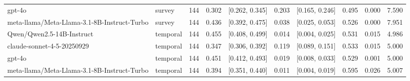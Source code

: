\begin{table}
\begin{tabular}{llrrlrlrrr}
gpt-4o & survey & 144 & 0.302 & [0.262, 0.345] & 0.203 & [0.165, 0.246] & 0.495 & 0.000 & 7.590 \\
meta-llama/Meta-Llama-3.1-8B-Instruct-Turbo & survey & 144 & 0.436 & [0.392, 0.475] & 0.038 & [0.025, 0.053] & 0.526 & 0.000 & 7.951 \\
Qwen/Qwen2.5-14B-Instruct & temporal & 144 & 0.455 & [0.408, 0.499] & 0.014 & [0.004, 0.025] & 0.531 & 0.015 & 4.986 \\
claude-sonnet-4-5-20250929 & temporal & 144 & 0.347 & [0.306, 0.392] & 0.119 & [0.089, 0.151] & 0.533 & 0.015 & 5.000 \\
gpt-4o & temporal & 144 & 0.451 & [0.412, 0.493] & 0.019 & [0.008, 0.033] & 0.529 & 0.001 & 5.000 \\
meta-llama/Meta-Llama-3.1-8B-Instruct-Turbo & temporal & 144 & 0.394 & [0.351, 0.440] & 0.011 & [0.004, 0.019] & 0.595 & 0.026 & 5.007 \\
\bottomrule
\end{tabular}
\end{table}

